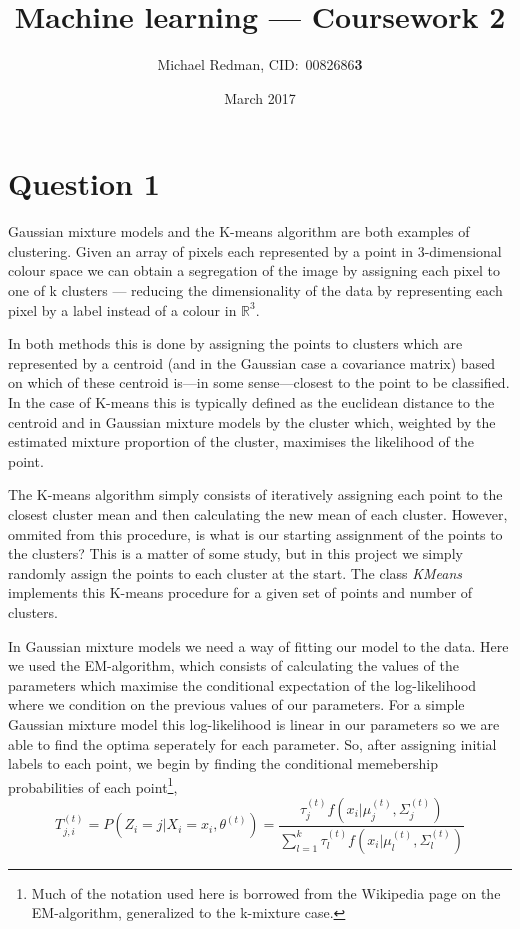 \documentclass[a4paper]{article}
\begin{document}
\title{Machine learning --- Coursework 2}
\author{Michael Redman, CID:\ 0082686\textbf{3}}
\date{March 2017}

\maketitle

\section*{Question 1}

Gaussian mixture models and the K-means algorithm are both examples of clustering. Given an array of pixels each represented by a point in 3-dimensional colour space we can obtain a segregation of the image by assigning each pixel to one of k clusters --- reducing the dimensionality of the data by representing each pixel by a label instead of a colour in $\mathbb{R}^3$. 

In both methods this is done by assigning the points to clusters which are represented by a centroid (and in the Gaussian case a covariance matrix) based on which of these centroid is---in some sense---closest to the point to be classified. In the case of K-means this is typically defined as the euclidean distance to the centroid and in Gaussian mixture models by the cluster which, weighted by the estimated mixture proportion of the cluster, maximises the likelihood of the point.

The K-means algorithm simply consists of iteratively assigning each point to the closest cluster mean and then calculating the new mean of each cluster. However, ommited from this procedure, is what is our starting assignment of the points to the clusters? This is a matter of some study, but in this project we simply randomly assign the points to each cluster at the start. The class \emph{KMeans} implements this K-means procedure for a given set of points and number of clusters.    

In Gaussian mixture models we need a way of fitting our model to the data. Here we used the EM-algorithm, which consists of calculating the values of the parameters which maximise the conditional expectation of the log-likelihood where we condition on the previous values of our parameters. For a simple Gaussian mixture model this log-likelihood is linear in our parameters so we are able to find the optima seperately for each parameter. So, after assigning initial labels to each point, we begin by finding the conditional memebership probabilities of each point\footnote{Much of the notation used here is borrowed from the Wikipedia page on the EM-algorithm, generalized to the k-mixture case.},
\begin{equation}
T_{j,i}^{(t)} = P(Z_i = j | X_i = x_i, \theta^{(t)}) = \frac{\tau_j^(t) f(x_i | \mu_j^{(t)}, \Sigma_j^{(t)})}{\sum_{l=1}^k \tau_l^(t) f(x_i | \mu_l^{(t)}, \Sigma_l^{(t)})}
\end{equation}
\end{document}
